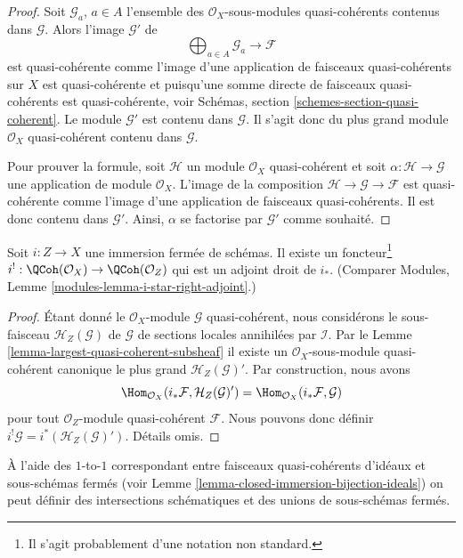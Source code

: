 \begin{proof}
Soit $\mathcal{G}_a$, $a \in A$ l'ensemble des $\mathcal{O}_X$-sous-modules
quasi-cohérents contenus dans $\mathcal{G}$.
Alors l'image $\mathcal{G}'$ de
$$
\bigoplus\nolimits_{a \in A} \mathcal{G}_a \longrightarrow \mathcal{F}
$$
est quasi-cohérente comme l'image d'une application de faisceaux quasi-cohérents
sur $X$ est quasi-cohérente et puisqu'une somme directe
de faisceaux quasi-cohérents
est quasi-cohérente, voir Schémas, section \ref{schemes-section-quasi-coherent}.
Le module $\mathcal{G}'$ est contenu dans $\mathcal{G}$. Il s'agit donc
du plus grand module $\mathcal{O}_X$ quasi-cohérent contenu dans $\mathcal{G}$.

\medskip\noindent
Pour prouver la formule, soit $\mathcal{H}$ un module
$\mathcal{O}_X$ quasi-cohérent et soit $\alpha : \mathcal{H} \to \mathcal{G}$ une application
de module $\mathcal{O}_X$. L'image de la composition $\mathcal{H} \to \mathcal{G} \to \mathcal{F}$
est quasi-cohérente comme l'image d'une application
de faisceaux quasi-cohérents. Il est donc contenu dans $\mathcal{G}'$.
Ainsi, $\alpha$ se factorise par $\mathcal{G}'$ comme
souhaité.
\end{proof}

\begin{lemma}
\label{lemma-i-upper-shriek}
Soit $i : Z \to X$ une immersion fermée de schémas.
Il existe un foncteur\footnote{Il s'agit probablement
d'une notation non standard.}
$i^! : \QCoh(\mathcal{O}_X) \to \QCoh(\mathcal{O}_Z)$ qui est un adjoint droit de
$i_*$. (Comparer Modules, Lemme \ref{modules-lemma-i-star-right-adjoint}.)
\end{lemma}

\begin{proof}
Étant donné le $\mathcal{O}_X$-module $\mathcal{G}$ quasi-cohérent,
nous considérons le sous-faisceau $\mathcal{H}_Z(\mathcal{G})$ de $\mathcal{G}$ de sections
locales annihilées par
$\mathcal{I}$. Par le Lemme \ref{lemma-largest-quasi-coherent-subsheaf} il existe
un $\mathcal{O}_X$-sous-module quasi-cohérent canonique le plus grand
$\mathcal{H}_Z(\mathcal{G})'$. Par construction, nous avons
$$
\Hom_{\mathcal{O}_X}(i_*\mathcal{F}, \mathcal{H}_Z(\mathcal{G})')
=
\Hom_{\mathcal{O}_X}(i_*\mathcal{F}, \mathcal{G})
$$
pour tout $\mathcal{O}_Z$-module quasi-cohérent $\mathcal{F}$.
Nous pouvons donc définir $i^!\mathcal{G} = i^*(\mathcal{H}_Z(\mathcal{G})')$. Détails
omis.
\end{proof}

\noindent
À l'aide des $1$-to-$1$ correspondant entre faisceaux
quasi-cohérents d'idéaux et sous-schémas
fermés (voir Lemme \ref{lemma-closed-immersion-bijection-ideals}) on peut définir
des intersections schématiques et des unions de sous-schémas
fermés.

